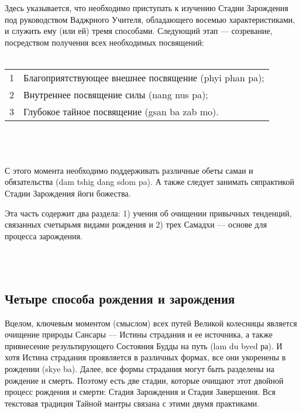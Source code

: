 Здесь указывается, что необходимо приступать к изучению Стадии Зарождения под
руководством Ваджрного Учителя, обладающего восемью характеристиками, и служить ему
(или ей) тремя способами. Следующий этап — созревание, посред\-ством получения всех
необходимых посвящений:\\
\\
\begin{tabular}{ll}
1 & Благоприятствующее внешнее посвящение (phyi phan pa);\\
2 & Внутреннее посвящение силы (nang nus pa);\\
3 & Глубокое тайное посвящение (gsan ba zab mo).\\
\end{tabular}
\\
\\
\\
С этого момента необходимо поддерживать различные обеты самаи и обязательства
(dam tshig dang sdom pa). А также следует занимать сяпрактикой Стадии Зарождения йоги
божества.\\

\begin{siderules}
Эта часть содержит два раздела: 1) учения об очищении привычных тенденций, связанных счетырьмя видами рождения и
2) трех Самадхи — основе для процесса зарождения.
\end{siderules}
\\
\\
\newpage

\subsection{Четыре способа рождения и зарождения}
\vspace{1cm}
\begin{siderules}
Вцелом, ключевым моментом (смыслом) всех путей Великой колесницы является очищение
природы Сансары — Истины страдания и ее источника, а также привнесение
результи\-рующего Состояния Будды на путь (lam du byed ра). И хотя Истина страдания
проявляется в различных формах, все они укоренены в рождении (skye ba).
Далее, все формы страдания могут быть разделены на рождение и смерть.
Поэтому есть две стадии, которые очищают этот двойной процесс рождения и смерти:
Стадия Зарождения и Стадия Завершения. Вся текстовая традиция Тайной мантры
связана с этими двумя практиками.
\end{siderules}

